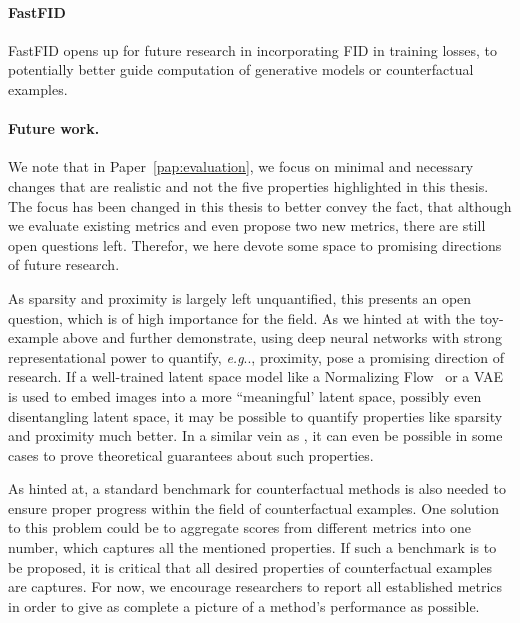 \documentclass[11pt,a4paper,twoside,openright,final]{memoir}
\makeatletter
\DeclareRobustCommand\onedot{\futurelet\@let@token\@onedot}
\def\@onedot{\ifx\@let@token.\else.\null\fi\xspace}
\def\eg{\emph{e.g}\onedot} \def\Eg{\emph{E.g}\onedot}
\newcommand*{\paperref}[1]{Paper~\hyperref[#1]{\ref{#1}}}
\makeatother
\begin{document}
\paragraph{FastFID}
FastFID opens up for future research in incorporating FID in training losses, to potentially better guide computation of generative models or counterfactual examples. 




\paragraph{Future work.}
We note that in \paperref{pap:evaluation}, we focus on minimal and necessary changes that are realistic and not the five properties highlighted in this thesis.
The focus has been changed in this thesis to better convey the fact, that although we evaluate existing metrics and even propose two new metrics, there are still open questions left. 
Therefor, we here devote some space to promising directions of future research. 

As sparsity and proximity is largely left unquantified, this presents an open question, which is of high importance for the field.
As we hinted at with the toy-example above and \citet{Rodriguez2021} further demonstrate, using deep neural networks with strong representational power to quantify, \eg, proximity, pose a promising direction of research.
If a well-trained latent space model like a Normalizing Flow~\cite{glow} or a VAE is used
to embed images into a more ``meaningful' latent space, possibly even disentangling latent space, it may be possible to 
quantify properties like sparsity and proximity much better.
In a similar vein as \cite{flowcounterfactuals}, it can even be possible in some cases to prove theoretical guarantees about such properties. 

As hinted at, a standard benchmark for counterfactual methods is also needed to ensure proper progress within the field of counterfactual examples. 
One solution to this problem could be to aggregate scores from different metrics into one number, which captures all the mentioned properties.
If such a benchmark is to be proposed, it is critical that all desired properties of counterfactual examples are captures.
For now, we encourage researchers to report all established metrics in order to give as complete a picture of a method's performance as possible.



\end{document}
